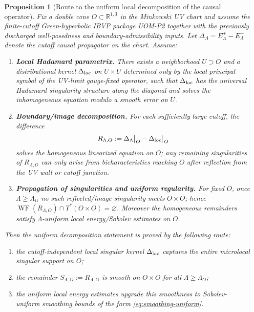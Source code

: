 \documentclass[10pt]{article}
\theoremstyle{definition}
\theoremstyle{plain}
\newtheorem{proposition}{Proposition}[section]
\begin{document}
\begin{proposition}[Route to the uniform local decomposition of the causal operator]
\label{prop:uom-U-Delta-route}
Fix a double cone $O\subset\mathbb R^{1,3}$ in the Minkowski UV chart and assume the finite-cutoff
Green-hyperbolic IBVP package UOM-P2 together with the previously discharged well-posedness and boundary-admissibility inputs.  Let
\(
\Delta_\Lambda=E_\Lambda^+-E_\Lambda^-
\)
denote the cutoff causal propagator on the chart.  Assume:
\begin{enumerate}[label=\textnormal{(\roman*)},leftmargin=2.2em,itemsep=1pt]
\item \textbf{Local Hadamard parametrix.}
There exists a neighborhood $U\supset O$ and a distributional kernel $\Delta_{\rm loc}$ on $U\times U$ determined only by the local principal symbol
of the UV-limit gauge-fixed operator, such that $\Delta_{\rm loc}$ has the universal Hadamard singularity structure along the diagonal and solves the
inhomogeneous equation modulo a smooth error on $U$.
\item \textbf{Boundary/image decomposition.}
For each sufficiently large cutoff, the difference
\[
R_{\Lambda,O}:=\Delta_\Lambda\big|_{O}-\Delta_{\rm loc}\big|_{O}
\]
solves the homogeneous linearized equation on $O$; any remaining singularities of $R_{\Lambda,O}$ can only arise from bicharacteristics reaching $O$
after reflection from the UV wall or cutoff junction.
\item \textbf{Propagation of singularities and uniform regularity.}
For fixed $O$, once $\Lambda\ge\Lambda_O$ no such reflected/image singularity meets $O\times O$; hence
\(
\operatorname{WF}(R_{\Lambda,O})\cap T^*(O\times O)=\varnothing
\).
Moreover the homogeneous remainders satisfy $\Lambda$-uniform local energy/Sobolev estimates on $O$.
\end{enumerate}
Then the uniform decomposition statement is proved by the following route:
\begin{enumerate}[label=\textnormal{(D\arabic*)},leftmargin=2.4em,itemsep=1pt]
\item the cutoff-independent local singular kernel $\Delta_{\rm loc}$ captures the entire microlocal singular support on $O$;
\item the remainder $S_{\Lambda,O}:=R_{\Lambda,O}$ is smooth on $O\times O$ for all $\Lambda\ge\Lambda_O$;
\item the uniform local energy estimates upgrade this smoothness to Sobolev-uniform smoothing bounds of the form
\eqref{eq:smoothing-uniform}.
\end{enumerate}
\end{proposition}
\end{document}
